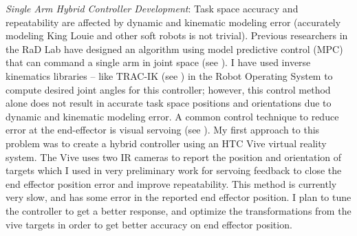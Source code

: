 \documentclass[12pt, letterpaper]{article}
\begin{document}
\textit{Single Arm Hybrid Controller Development}: Task space accuracy and repeatability are affected by dynamic and kinematic modeling error (accurately modeling King Louie and other soft robots is not trivial). Previous researchers in the RaD Lab have designed an algorithm using model predictive control (MPC) that can command a single arm in joint space (see \cite{best2016new}). I have used inverse kinematics libraries – like TRAC-IK (see \cite{beeson2015trac}) in the Robot Operating System to compute desired joint angles for this controller; however, this control method alone does not result in accurate task space positions and orientations due to dynamic and kinematic modeling error. A common control technique to reduce error at the end-effector is visual servoing (see \cite{Wang2016, Vahrenkamp2009}). My first approach to this problem was to create a hybrid controller using an HTC Vive virtual reality system. The Vive uses two IR cameras to report the position and orientation of targets which I used in very preliminary work for servoing feedback to close the end effector position error and improve repeatability. This method is currently very slow, and has some error in the reported end effector position. I plan to tune the controller to get a better response, and optimize the transformations from the vive targets in order to get better accuracy on end effector position.

 
\end{document}
